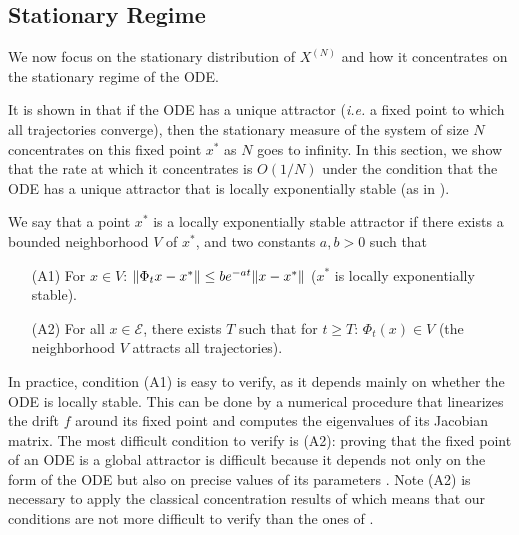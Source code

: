 \documentclass[sigconf]{acmart}
\newcommand\XN{X^{(N)}}
\newcommand\E{\mathcal{E}}
\newcommand\norm[1]{{\mathchoice{\bnorm{#1}}{\snorm{#1}}{\snorm{#1}}{\snorm{#1}}}}
\newcommand\bnorm[1]{\left\|#1\right\|}
\newcommand\snorm[1]{\|#1\|}
\begin{document}
\subsection{Stationary Regime}
\label{sec:steady}

We now focus on the stationary distribution of $\XN$ and how it
concentrates on the stationary regime of the ODE.

It is shown in \cite{benaim2008class} that if the ODE has a unique
attractor (\emph{i.e.} a fixed point to which all trajectories
converge), then the stationary measure of the system of size $N$
concentrates on this fixed point $x^*$ as $N$ goes to infinity.  In
this section, we show that the rate at which it concentrates is
$O(1/N)$ under the condition that the ODE has a unique attractor that
is locally exponentially stable (as in \cite{ying2016rate}).

We say that a point $x^*$ is a locally exponentially stable attractor
if there exists a bounded neighborhood $V$ of $x^*$, and two constants
$a,b>0$ such that
\begin{itemize}
\item[(A1)] For $x\in V$:
  $\norm{\Phi_tx-x^*}\le be^{-at}\norm{x-x^*}$ ($x^*$ is locally
  exponentially stable).
\item[(A2)] For all $x\in\E$, there exists $T$ such that for $t\ge T$:
  $\Phi_{t}(x)\in V$ (the neighborhood $V$ attracts all trajectories).
\end{itemize}
In practice, condition (A1) is easy to verify, as it depends mainly on
whether the ODE is locally stable. This can be done by a numerical
procedure that linearizes the drift $f$ around its fixed point and
computes the eigenvalues of its Jacobian matrix. The most difficult
condition to verify is (A2): proving that the fixed point of an ODE is
a global attractor is difficult because it depends not only on the
form of the ODE but also on precise values of its parameters
\cite{benaim2008class,cho2010validity}.  Note (A2) is necessary to
apply the classical concentration results of \cite{benaim2008class}
which means that our conditions are not more difficult to verify than
the ones of \cite{benaim2008class}.
\end{document}
